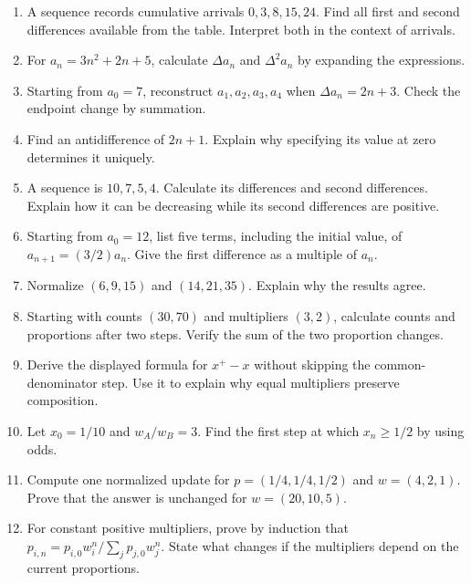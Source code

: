 \documentclass[11pt,oneside,openany]{book}
\theoremstyle{definition}
\theoremstyle{remark}
\newenvironment{exercises}{\begin{enumerate}[label=\thechapter.\arabic*,ref=\thechapter.\arabic*,leftmargin=2.8em,itemsep=6pt]}{\end{enumerate}}
\numberwithin{equation}{chapter}
\begin{document}
\begin{exercises}

\item 

A sequence records cumulative arrivals \(0,3,8,15,24\). Find all first and second differences available from the table. Interpret both in the context of arrivals.

\item 

For \(a_n=3n^2+2n+5\), calculate \(\Delta a_n\) and \(\Delta^2a_n\) by expanding the expressions.

\item 

Starting from \(a_0=7\), reconstruct \(a_1,a_2,a_3,a_4\) when \(\Delta a_n=2n+3\). Check the endpoint change by summation.

\item 

Find an antidifference of \(2n+1\). Explain why specifying its value at zero determines it uniquely.

\item 

A sequence is \(10,7,5,4\). Calculate its differences and second differences. Explain how it can be decreasing while its second differences are positive.

\item 

Starting from \(a_0=12\), list five terms, including the initial value, of \(a_{n+1}=(3/2)a_n\). Give the first difference as a multiple of \(a_n\).

\item 

Normalize \((6,9,15)\) and \((14,21,35)\). Explain why the results agree.

\item 

Starting with counts \((30,70)\) and multipliers \((3,2)\), calculate counts and proportions after two steps. Verify the sum of the two proportion changes.

\item 

Derive the displayed formula for \(x^+-x\) without skipping the common-denominator step. Use it to explain why equal multipliers preserve composition.

\item 

Let \(x_0=1/10\) and \(w_A/w_B=3\). Find the first step at which \(x_n\geq1/2\) by using odds.

\item 

Compute one normalized update for \(p=(1/4,1/4,1/2)\) and \(w=(4,2,1)\). Prove that the answer is unchanged for \(w=(20,10,5)\).

\item 

For constant positive multipliers, prove by induction that \(p_{i,n}=p_{i,0}w_i^n/\sum_jp_{j,0}w_j^n\). State what changes if the multipliers depend on the current proportions.

\end{exercises}
\end{document}
